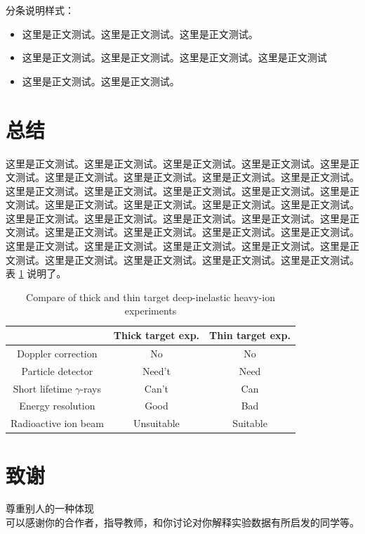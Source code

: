 \documentclass[prc,twocolumn,superscriptaddress,showkeys,showpacs,amssymb,amsmath,amsfonts,aps]{revtex4}
\begin{document}
分条说明样式：
\begin{itemize}
\item 这里是正文测试。这里是正文测试。这里是正文测试。
\item 这里是正文测试。这里是正文测试。这里是正文测试。这里是正文测试
\item 这里是正文测试。这里是正文测试。
\end{itemize}


\section{总结}%
这里是正文测试。这里是正文测试。这里是正文测试。这里是正文测试。这里是正文测试。这里是正文测试。这里是正文测试。这里是正文测试。这里是正文测试。这里是正文测试。这里是正文测试。这里是正文测试。这里是正文测试。这里是正文测试。这里是正文测试。这里是正文测试。这里是正文测试。这里是正文测试。这里是正文测试。这里是正文测试。这里是正文测试。这里是正文测试。这里是正文测试。这里是正文测试。这里是正文测试。这里是正文测试。这里是正文测试。这里是正文测试。这里是正文测试。这里是正文测试。这里是正文测试。这里是正文测试。这里是正文测试。这里是正文测试。这里是正文测试。这里是正文测试。表 \ref{varelcoupl} 说明了。
\begin{table}
\caption{Compare of thick and thin target deep-inelastic heavy-ion experiments}
\begin{ruledtabular}
\begin{tabular}{ccc}
                                & Thick target exp. & Thin target exp.  \\      \hline
Doppler correction              & No                & No                \\
Particle detector               & Need't            & Need              \\
Short lifetime $\gamma$-rays    & Can't             & Can               \\
Energy resolution               & Good              & Bad               \\
Radioactive ion beam            & Unsuitable        & Suitable          \\
\end{tabular}
\end{ruledtabular}
\label{varelcoupl}
\end{table}

\section{致谢}%
尊重别人的一种体现\\
可以感谢你的合作者，指导教师，和你讨论对你解释实验数据有所启发的同学等。
\end{document}
